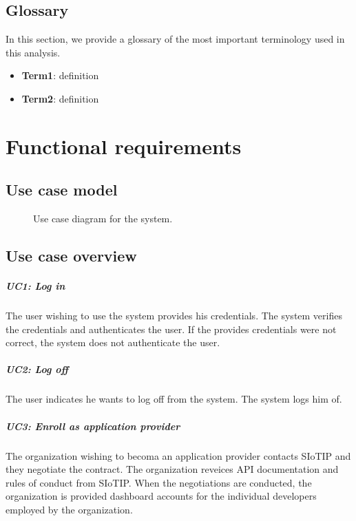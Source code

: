 \documentclass[english]{sareport}
\begin{document}
\section{Glossary}
In this section, we provide a glossary of the most important terminology used
in this analysis.

\begin{itemize}
    \item \textbf{Term1}: definition
    \item \textbf{Term2}: definition
\end{itemize}

\chapter{Functional requirements}\label{sec:functional}
\section*{Use case model}

\begin{figure}[!htp]
    \centering
    \caption{Use case diagram for the system.}\label{fig:use_case_model}
\end{figure}

\section{Use case overview}\label{sec:uc_overview}
\paragraph{UC1: Log in}
The user wishing to use the system provides his credentials.
The system verifies the credentials and authenticates the user.
If the provides credentials were not correct, the system does not authenticate the user.

\paragraph{UC2: Log off}
The user indicates he wants to log off from the system.
The system logs him of.

\paragraph{UC3: Enroll as application provider}
The organization wishing to becoma an application provider contacts SIoTIP and they negotiate the contract. The organization reveices API documentation and rules of conduct from SIoTIP. When the negotiations are conducted, the organization is provided dashboard accounts for the individual developers employed by the organization.
\end{document}
